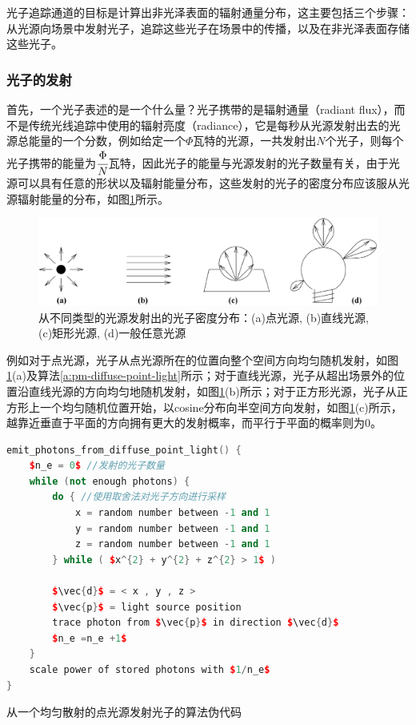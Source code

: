 光子追踪通道的目标是计算出非光泽表面的辐射通量分布，这主要包括三个步骤：从光源向场景中发射光子，追踪这些光子在场景中的传播，以及在非光泽表面存储这些光子。



\subsubsection{光子的发射}
首先，一个光子表述的是一个什么量？光子携带的是辐射通量（radiant flux），而不是传统光线追踪中使用的辐射亮度（radiance），它是每秒从光源发射出去的光源总能量的一个分数，例如给定一个$\Phi$瓦特的光源，一共发射出$N$个光子，则每个光子携带的能量为$ \cfrac{\Phi}{N}$瓦特，因此光子的能量与光源发射的光子数量有关，由于光源可以具有任意的形状以及辐射能量分布，这些发射的光子的密度分布应该服从光源辐射能量的分布，如图\ref{f:pm-photon-emission}所示。

\begin{figure}
	\includegraphics[width=1.0\textwidth]{figures/pm/pm-3}
	\caption{从不同类型的光源发射出的光子密度分布：(a)点光源, (b)直线光源, (c)矩形光源, (d)一般任意光源}
	\label{f:pm-photon-emission}
\end{figure}

例如对于点光源，光子从点光源所在的位置向整个空间方向均匀随机发射，如图\ref{f:pm-photon-emission}(a)及算法\ref{a:pm-diffuse-point-light}所示；对于直线光源，光子从超出场景外的位置沿直线光源的方向均匀地随机发射，如图\ref{f:pm-photon-emission}(b)所示；对于正方形光源，光子从正方形上一个均匀随机位置开始，以cosine分布向半空间方向发射，如图\ref{f:pm-photon-emission}(c)所示，越靠近垂直于平面的方向拥有更大的发射概率，而平行于平面的概率则为0。

\begin{algorithm}
\begin{lstlisting}[language=C++, mathescape]
emit_photons_from_diffuse_point_light() {
	$n_e = 0$ //发射的光子数量
 	while (not enough photons) {
		do { //使用取舍法对光子方向进行采样
 			x = random number between -1 and 1
			y = random number between -1 and 1
			z = random number between -1 and 1
		} while ( $x^{2} + y^{2} + z^{2} > 1$ )
 			
		$\vec{d}$ = < x , y , z >
		$\vec{p}$ = light source position
		trace photon from $\vec{p}$ in direction $\vec{d}$ 
 		$n_e =n_e +1$
	}
	scale power of stored photons with $1/n_e$ 
}
\end{lstlisting}
\caption{从一个均匀散射的点光源发射光子的算法伪代码}
\label{a:pm-diffuse-point-light}
\end{algorithm}

